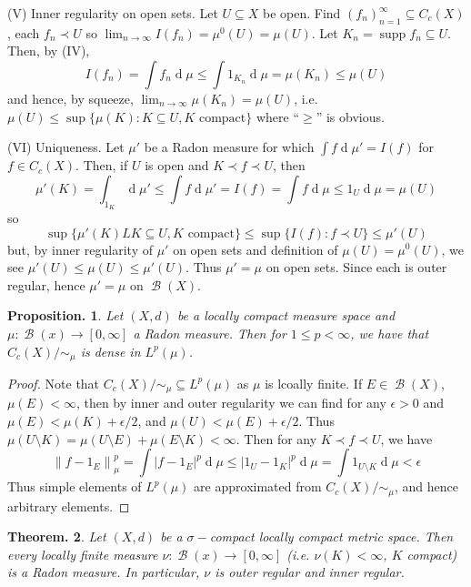 \documentclass[11pt, a4paper]{memoir}
\newcommand{\norm}[1]{\ensuremath{\left\lVert#1\right\rVert}}
\theoremstyle{change}
\newtheorem{theorem}{Theorem.}[section]
\newtheorem{proposition}[theorem]{Proposition.}
\theoremstyle{plain}
\theoremstyle{nonumberplain}
\newtheorem{proof}{Proof}
\DeclareMathOperator{\B}{{\mathcal{B}}}
\DeclareMathOperator{\supp}{supp}
\renewcommand{\d}[1]{\ensuremath{\operatorname{d}\!{#1}}}
\numberwithin{equation}{section}
\begin{document}
(V) Inner regularity on open sets.
Let $U\subseteq X$ be open.
Find $(f_n)_{n=1}^\infty\subseteq C_c(X)$, each $f_n\prec U$ so $\lim_{n\to\infty}I(f_n)=\mu^0(U)=\mu(U)$.
Let $K_n=\supp f_n\subseteq U$.
Then, by (IV),
\begin{equation*}
    I(f_n)=\int f_n\d{\mu}\leq\int 1_{K_n}\d{\mu}=\mu(K_n)\leq \mu(U)
\end{equation*}
and hence, by squeeze, $\lim_{n\to\infty}\mu(K_n)=\mu(U)$, i.e. $\mu(U)\leq\sup\{\mu(K):K\subseteq U,K\text{ compact}\}$ where ``$\geq$'' is obvious.

(VI) Uniqueness.
Let $\mu'$ be a Radon measure for which $\int f\d{\mu'}=I(f)$ for $f\in C_c(X)$.
Then, if $U$ is open and $K\prec f\prec U$, then
\begin{equation*}
    \mu'(K)=\int_{1_K}\d{\mu'}\leq\int f\d{\mu'}=I(f)=\int f\d{\mu}\leq 1_U\d{\mu}=\mu(U)
\end{equation*}
so
\begin{equation*}
    \sup\{\mu'(K)LK\subseteq U,K\text{ compact}\}\leq\sup\{I(f):f\prec U\}\leq\mu'(U)
\end{equation*}
but, by inner regularity of $\mu'$ on open sets and definition of $\mu(U)=\mu^0(U)$, we see $\mu'(U)\leq \mu(U)\leq\mu'(U)$.
Thus $\mu'=\mu$ on open sets.
Since each is outer regular, hence $\mu'=\mu$ on $\B(X)$.
\begin{proposition}
    Let $(X,d)$ be a locally compact measure space and $\mu:\B(x)\to[0,\infty]$ a Radon measure.
    Then for $1\leq p<\infty$, we have that $C_c(X)/{\sim_\mu}$ is dense in $L^p(\mu)$.
\end{proposition}
\begin{proof}
    Note that $C_c(X)/{\sim_\mu}\subseteq L^p(\mu)$ as $\mu$ is lcoally finite.
    If $E\in\B(X)$, $\mu(E)<\infty$, then by inner and outer regularity we can find for any $\epsilon>0$ and $\mu(E)<\mu(K)+\epsilon/2$, and $\mu(U)<\mu(E)+\epsilon/2$.
    Thus $\mu(U\setminus K)=\mu(U\setminus E)+\mu(E\setminus K)<\infty$.
    Then for any $K\prec f\prec U$, we have
    \begin{equation*}
        \norm{f-1_E}_\mu^p=\int|f-1_E|^p\d{\mu}\leq|1_U-1_K|^p\d{\mu}=\int1_{U\setminus K}\d{\mu}<\epsilon
    \end{equation*}
    Thus simple elements of $L^p(\mu)$ are approximated from $C_c(X)/{\sim_\mu}$, and hence arbitrary elements.
\end{proof}
\begin{theorem}
    Let $(X,d)$ be a $\sigma-$compact locally compact metric space.
    Then every locally finite measure $\nu:\B(x)\to[0,\infty]$ (i.e. $\nu(K)<\infty$, $K$ compact) is a Radon measure.
    In particular, $\nu$ is outer regular and inner regular.
\end{theorem}
\end{document}
